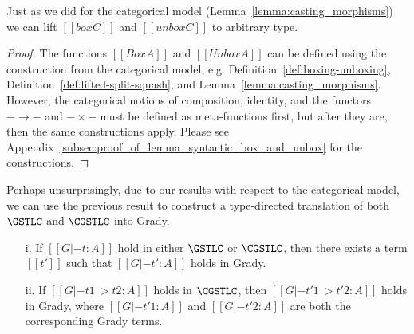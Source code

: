 Just as we did for the categorical model
(Lemma~\ref{lemma:casting_morphisms}) we can lift $[[box C]]$ and
$[[unbox C]]$ to arbitrary type.
\begin{proof}
  The functions $[[Box A]]$ and $[[Unbox A]]$ can be defined using the
  construction from the categorical model,
  e.g. Definition~\ref{def:boxing-unboxing},
  Definition~\ref{def:lifted-split-squash}, and
  Lemma~\ref{lemma:casting_morphisms}.  However, the categorical
  notions of composition, identity, and the functors $- \to -$ and $-
  \times -$ must be defined as meta-functions first, but after they
  are, then the same constructions apply.  Please see
  Appendix~\ref{subsec:proof_of_lemma_syntactic_box_and_unbox} for the
  constructions.
\end{proof}
\noindent
Perhaps unsurprisingly, due to our results with respect to the
categorical model, we can use the previous result to construct a
type-directed translation of both $\GSTLC$ and
$\CGSTLC$ into Grady.
\begin{lemma}[Translations]
  \label{lemma:translations}
  \begin{center}
    \begin{itemize}
    \item[] 
    \item[i.] If $[[G |- t : A]]$ hold in either $\GSTLC$ or
      $\CGSTLC$, then there exists a term
      $[[t']]$ such that $[[G |- t' : A]]$ holds in Grady.
    \item[ii.] If $[[G |- t1 ~> t2 : A]]$ holds in $\CGSTLC$, then
      $[[G |- t'1 ~> t'2 : A]]$ holds in Grady, where $[[G |- t'1 :
        A]]$ and $[[G |- t'2 : A]]$ are both the corresponding Grady
      terms.
    \end{itemize}
  \end{center}
\end{lemma}
